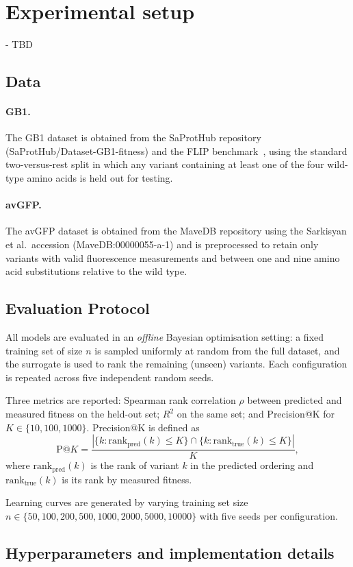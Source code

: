 \section{Experimental setup}
- TBD \subsection{Data}
\paragraph{GB1.}
The GB1 dataset is obtained from the SaProtHub repository (SaProtHub/Dataset-GB1-fitness)
and the FLIP benchmark~\cite{dallagoFLIPBenchmarkTasks2021}, using the standard two-versus-rest split
in which any variant containing at least one of the four wild-type amino acids is held out
for testing.

\paragraph{avGFP.}
The avGFP dataset is obtained from the MaveDB repository using the Sarkisyan et al.\
accession (MaveDB:00000055-a-1) and is preprocessed to retain only
variants with valid fluorescence measurements and between one and nine amino acid substitutions
relative to the wild type.
\subsection{Evaluation Protocol}

\label{sec:methods:eval}

All models are evaluated in an \emph{offline} Bayesian optimisation setting:
a fixed training set of size $n$ is sampled uniformly at random from the full dataset,
and the surrogate is used to rank the remaining (unseen) variants.
Each configuration is repeated across five independent random seeds.

Three metrics are reported: Spearman rank correlation $\rho$ between predicted and
measured fitness on the held-out set; $R^2$ on the same set; and Precision@K for
$K \in \{10, 100, 1000\}$.
Precision@K is defined as
\begin{equation}
  \text{P@}K = \frac{|\{k : \text{rank}_\text{pred}(k) \leq K\} \cap \{k : \text{rank}_\text{true}(k) \leq K\}|}{K},
\end{equation}
where $\text{rank}_\text{pred}(k)$ is the rank of variant $k$ in the predicted ordering and
$\text{rank}_\text{true}(k)$ is its rank by measured fitness.

Learning curves are generated by varying training set size
$n \in \{50, 100, 200, 500, 1000, 2000, 5000, 10000\}$ with five seeds per configuration.
\subsection{Hyperparameters and implementation details}